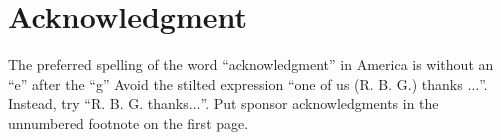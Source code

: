 \section*{Acknowledgment}

    The preferred spelling of the word ``acknowledgment'' in America is without an ``e'' after the ``g''
    Avoid the stilted expression ``one of us (R. B. G.) thanks $\ldots$''.
    Instead, try ``R. B. G. thanks$\ldots$''.
    Put sponsor acknowledgments in the unnumbered footnote on the first page.
